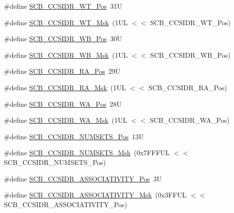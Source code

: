 \begin{DoxyCompactItemize}
\item 
\#define \hyperlink{group___c_m_s_i_s___s_c_b_ga4eaf5ef29d920023de2cf53b25d0d56c}{S\-C\-B\-\_\-\-C\-C\-S\-I\-D\-R\-\_\-\-W\-T\-\_\-\-Pos}~31\-U
\item 
\#define \hyperlink{group___c_m_s_i_s___s_c_b_ga9089551a75985fa7cf051062ed2d62b9}{S\-C\-B\-\_\-\-C\-C\-S\-I\-D\-R\-\_\-\-W\-T\-\_\-\-Msk}~(1\-U\-L $<$$<$ S\-C\-B\-\_\-\-C\-C\-S\-I\-D\-R\-\_\-\-W\-T\-\_\-\-Pos)
\item 
\#define \hyperlink{group___c_m_s_i_s___s_c_b_ga4a32c31034cf30f6fe4dfaa9d0d6a6af}{S\-C\-B\-\_\-\-C\-C\-S\-I\-D\-R\-\_\-\-W\-B\-\_\-\-Pos}~30\-U
\item 
\#define \hyperlink{group___c_m_s_i_s___s_c_b_gaa9c0516faf8b9c7ab4151823c48f39b6}{S\-C\-B\-\_\-\-C\-C\-S\-I\-D\-R\-\_\-\-W\-B\-\_\-\-Msk}~(1\-U\-L $<$$<$ S\-C\-B\-\_\-\-C\-C\-S\-I\-D\-R\-\_\-\-W\-B\-\_\-\-Pos)
\item 
\#define \hyperlink{group___c_m_s_i_s___s_c_b_ga379743eea011cede0032ecb7812b51e1}{S\-C\-B\-\_\-\-C\-C\-S\-I\-D\-R\-\_\-\-R\-A\-\_\-\-Pos}~29\-U
\item 
\#define \hyperlink{group___c_m_s_i_s___s_c_b_gaa77f28cbf94b44c1114a66e05cc43255}{S\-C\-B\-\_\-\-C\-C\-S\-I\-D\-R\-\_\-\-R\-A\-\_\-\-Msk}~(1\-U\-L $<$$<$ S\-C\-B\-\_\-\-C\-C\-S\-I\-D\-R\-\_\-\-R\-A\-\_\-\-Pos)
\item 
\#define \hyperlink{group___c_m_s_i_s___s_c_b_gade432ae0a64858e92fa35c2983fb47a4}{S\-C\-B\-\_\-\-C\-C\-S\-I\-D\-R\-\_\-\-W\-A\-\_\-\-Pos}~28\-U
\item 
\#define \hyperlink{group___c_m_s_i_s___s_c_b_ga519ebde5ad64be2098f586bddbc8e898}{S\-C\-B\-\_\-\-C\-C\-S\-I\-D\-R\-\_\-\-W\-A\-\_\-\-Msk}~(1\-U\-L $<$$<$ S\-C\-B\-\_\-\-C\-C\-S\-I\-D\-R\-\_\-\-W\-A\-\_\-\-Pos)
\item 
\#define \hyperlink{group___c_m_s_i_s___s_c_b_ga1028d2c238f74d2aa021f53ffbe8d7ab}{S\-C\-B\-\_\-\-C\-C\-S\-I\-D\-R\-\_\-\-N\-U\-M\-S\-E\-T\-S\-\_\-\-Pos}~13\-U
\item 
\#define \hyperlink{group___c_m_s_i_s___s_c_b_ga47d1f01185d7a039334031008386c5a8}{S\-C\-B\-\_\-\-C\-C\-S\-I\-D\-R\-\_\-\-N\-U\-M\-S\-E\-T\-S\-\_\-\-Msk}~(0x7\-F\-F\-F\-U\-L $<$$<$ S\-C\-B\-\_\-\-C\-C\-S\-I\-D\-R\-\_\-\-N\-U\-M\-S\-E\-T\-S\-\_\-\-Pos)
\item 
\#define \hyperlink{group___c_m_s_i_s___s_c_b_gae67f2f83976b819fb3039fc35cfef0fb}{S\-C\-B\-\_\-\-C\-C\-S\-I\-D\-R\-\_\-\-A\-S\-S\-O\-C\-I\-A\-T\-I\-V\-I\-T\-Y\-\_\-\-Pos}~3\-U
\item 
\#define \hyperlink{group___c_m_s_i_s___s_c_b_gae093c4c635dad43845967512fa87173a}{S\-C\-B\-\_\-\-C\-C\-S\-I\-D\-R\-\_\-\-A\-S\-S\-O\-C\-I\-A\-T\-I\-V\-I\-T\-Y\-\_\-\-Msk}~(0x3\-F\-F\-U\-L $<$$<$ S\-C\-B\-\_\-\-C\-C\-S\-I\-D\-R\-\_\-\-A\-S\-S\-O\-C\-I\-A\-T\-I\-V\-I\-T\-Y\-\_\-\-Pos)

\end{DoxyCompactItemize}
